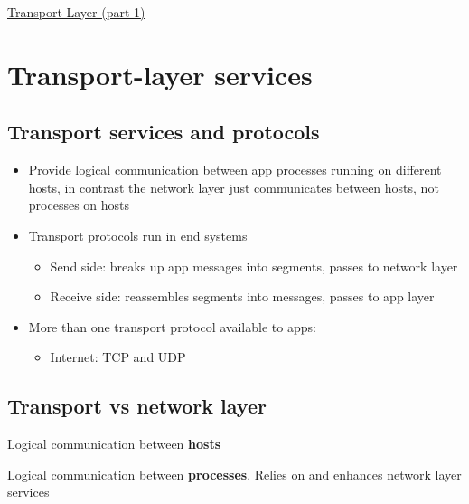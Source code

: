 \documentclass{article}[18pt]
\begin{document}
\begin{center}
\underline{\huge Transport Layer (part 1)}
\end{center}
\section{Transport-layer services}
\subsection{Transport services and protocols}
\begin{itemize}
	\item Provide logical communication between app processes running on different hosts, in contrast the network layer just communicates between hosts, not processes on hosts
	\item Transport protocols run in end systems
	\begin{itemize}
		\item Send side: breaks up app messages into segments, passes to network layer
		\item Receive side: reassembles segments into messages, passes to app layer
	\end{itemize}
	\item More than one transport protocol available to apps:
	\begin{itemize}
		\item Internet: TCP and UDP
	\end{itemize}
\end{itemize}
\subsection{Transport vs network layer}
\begin{defin}
Logical communication between \textbf{hosts}
\end{defin}
\begin{defin}
Logical communication between \textbf{processes}. Relies on and enhances network layer services
\end{defin}
\end{document}
